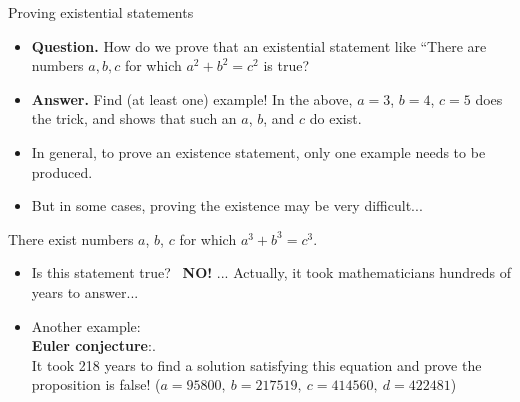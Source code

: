 \documentclass[11pt,aspectratio=1610]{beamer}
\begin{document}
		\begin{frame}{Proving existential statements}\p
			\vspace{-2mm}
			\begin{itemize}
				\item \textbf{Question.} How do we prove that an existential statement like ``There are numbers $a,b,c$ for which $a^2 + b^2 = c^2$ is true? \p
				\item \textbf{Answer.} Find (at least one) example! In the above, $a=3$, $b=4$, $c=5$ does the trick, and shows that such an $a$, $b$, and $c$ do exist. \p
				\item In general, to prove an existence statement, only one example needs to be produced. \p
				\item But in some cases, proving the existence may be very difficult... \p
			\end{itemize}
			\begin{example}
				There exist numbers $a$, $b$, $c$ for which $a^3 + b^3 = c^3$. 
			\end{example}\p
			\begin{itemize}
				\item Is this statement true?\p ~ \textbf{NO!} \p... Actually, it took mathematicians hundreds of years to answer... \p  
				\item Another example: \\ \finger \textbf{Euler conjecture}:. \\ \vspace{1mm} It took 218 years to find a solution satisfying this equation and prove the proposition is false! ($a=95800,~b=217519,~c=414560,~d=422481$)
			\end{itemize}
		\end{frame}
		
		
		
		
		
\end{document}
